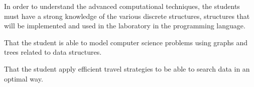 \begin{syllabus}


\begin{justification}
In order to understand the advanced computational techniques, the students must have a strong knowledge of the
various discrete structures, structures that will be implemented and used in the laboratory in the programming language.
\end{justification}

\begin{goals}
\item That the student is able to model computer science problems using graphs and trees related to data structures.
\item That the student apply efficient travel strategies to be able to search data in an optimal way.
\end{goals}

\begin{outcomes}
    \item {} %
    \item {} %
    \item {} %
    \item {} %
\end{outcomes}

\begin{competences}
    \item {} %
    \item {}
    \item {} %
    \item {} %
    \item {} %
    \item {} %
\end{competences}


\end{syllabus}
